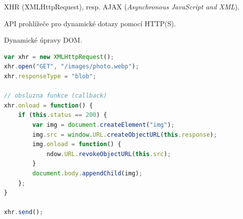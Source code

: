 \begin{compactitem}
    \item XHR (XMLHttpRequest), resp. AJAX (\textit{Asynchronous JavaScript and XML}).

    \item API prohlížeče pro dynamické dotazy pomocí HTTP(S). \begin{compactitem}
        \item Dynamické úpravy DOM.
    \end{compactitem}
\end{compactitem}

\noindent\begin{minipage}{\linewidth}
    \begin{lstlisting}[language=javascript, caption={Příklad využití XHR.}]
var xhr = new XMLHttpRequest();
xhr.open("GET", "/images/photo.webp");
xhr.responseType = "blob";

// obsluzna funkce (callback)
xhr.onload = function() {
    if (this.status == 200) {
        var img = document.createElement("img");
        img.src = window.URL.createObjectURL(this.response);
        img.onload = function() {
            ndow.URL.revokeObjectURL(this.src);
        }
        document.body.appendChild(img);
    };
}

xhr.send();
\end{lstlisting}
\end{minipage}
